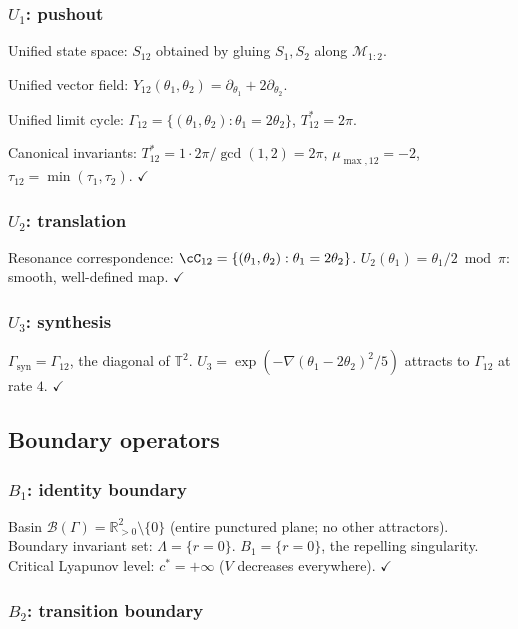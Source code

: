 \documentclass[reqno]{amsart}
\numberwithin{equation}{section}
\theoremstyle{plain}
\theoremstyle{definition}
\theoremstyle{remark}
\newcommand{\R}{\mathbb{R}}
\newcommand{\T}{\mathbb{T}}
\newcommand{\Orb}{\Gamma}
\newcommand{\cB}{\mathcal{B}}
\newcommand{\cM}{\mathcal{M}}
\DeclareMathOperator{\gcd}{gcd}
\begin{document}
\subsubsection{$U_1$: pushout}

Unified state space: $S_{12}$ obtained by gluing $S_1,S_2$ along
$\cM_{1:2}$.

Unified vector field:
$Y_{12}(\theta_1,\theta_2)=\partial_{\theta_1}+2\partial_{\theta_2}$.

Unified limit cycle:
$\Orb_{12}=\{(\theta_1,\theta_2):\theta_1=2\theta_2\}$, $T_{12}^*=2\pi$.

Canonical invariants:
$T_{12}^*=1\cdot 2\pi/\gcd(1,2)=2\pi$, $\mu_{\max,12}=-2$,
$\tau_{12}=\min(\tau_1,\tau_2)$. $\checkmark$

\subsubsection{$U_2$: translation}

Resonance correspondence: $\cC_{12}=\{(\theta_1,\theta_2):\theta_1=2\theta_2\}$.
$U_2(\theta_1)=\theta_1/2\bmod\pi$: smooth, well-defined map. $\checkmark$

\subsubsection{$U_3$: synthesis}

$\Orb_{\mathrm{syn}}=\Orb_{12}$, the diagonal of $\T^2$.
$U_3=\exp(-\nabla(\theta_1-2\theta_2)^2/5)$ attracts to
$\Orb_{12}$ at rate $4$. $\checkmark$

\subsection{Boundary operators}

\subsubsection{$B_1$: identity boundary}

Basin $\cB(\Orb)=\R^2_{>0}\setminus\{0\}$ (entire punctured plane;
no other attractors). Boundary invariant set: $\Lambda=\{r=0\}$.
$B_1=\{r=0\}$, the repelling singularity. Critical Lyapunov level:
$c^*=+\infty$ ($V$ decreases everywhere). $\checkmark$

\subsubsection{$B_2$: transition boundary}
\end{document}

